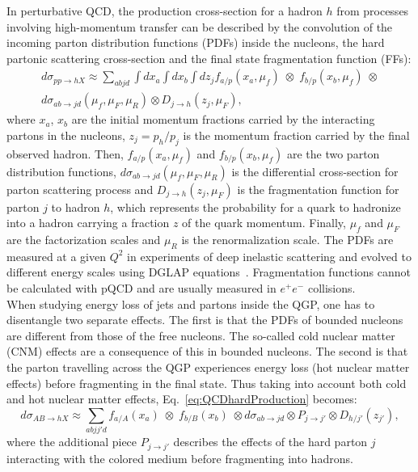 In perturbative QCD, the production cross-section for a hadron $h$ from processes involving high-momentum transfer can be described by the convolution of the incoming parton distribution functions (PDFs) inside the nucleons, the hard partonic scattering cross-section and the final state fragmentation function (FFs):
\begin{equation}
\label{eq:QCDhardProduction}
\begin{split}
d\sigma_{pp\rightarrow hX} \approx \sum_{abjd}\int dx_a \int dx_b \int dz_j f_{a/p} (x_a, \mu_f) \; \otimes \;f_{b/p} (x_b, \mu_f) \;\otimes \\
d\sigma_{ab \rightarrow jd} (\mu_f,\mu_F,\mu_R) \otimes D_{j\rightarrow h} (z_j,\mu_F), 
\end{split}
\end{equation}
where $x_a$, $x_b$ are the initial momentum fractions carried by the interacting partons in the nucleons, $z_j = p_h/p_j$ is the momentum fraction carried by the final observed hadron. Then, $f_{a/p} (x_a, \mu_f)$ and $f_{b/p} (x_b, \mu_f) $ are the two parton distribution functions, $d\sigma_{ab \rightarrow jd} (\mu_f,\mu_F,\mu_R) $ is the differential cross-section for parton scattering process and $D_{j\rightarrow h} (z_j,\mu_F)$ is the fragmentation function for parton $j$ to hadron $h$, which represents the probability for a quark to hadronize into a hadron carrying a fraction $z$ of the quark momentum. Finally, $\mu_f$ and $\mu_F$ are the factorization scales and $\mu_R$ is the renormalization scale. The PDFs are measured at a given $Q^2$ in experiments of deep inelastic scattering and evolved to different energy scales using DGLAP equations~\cite{Altarelli:1977zs}. Fragmentation functions cannot be calculated with pQCD and are usually measured in $e^+e^-$ collisions.\\



When studying energy loss of jets and partons inside the QGP, one has to disentangle two separate effects. The first is that the PDFs of bounded nucleons are different from those of the free nucleons. The so-called cold nuclear matter (CNM) effects are a consequence of this in bounded nucleons. The second is that the parton travelling across the QGP experiences energy loss (hot nuclear matter effects) before fragmenting in the final state.
Thus taking into account both cold and hot nuclear matter effects, Eq.~\ref{eq:QCDhardProduction} becomes:
\begin{equation}
\label{eq:QCDwNuclEffects}
d\sigma_{AB\rightarrow hX} \approx \sum_{abjj\prime d} f_{a/A} (x_a) \; \otimes \;f_{b/B} (x_b) \;\otimes d\sigma_{ab\rightarrow jd} \otimes P_{j\rightarrow j\prime} \otimes D_{h/j\prime}(z_{j\prime}), 
\end{equation}
where the additional piece $P_{j\rightarrow j\prime}$ describes the effects of the hard parton $j$ interacting with the colored medium before fragmenting into hadrons. \\

